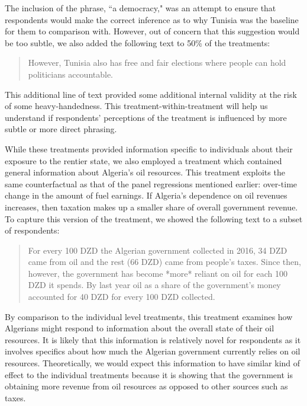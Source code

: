 \documentclass[12pt, letterpaper]{article}
\begin{document}
The inclusion of the phrase, ``a democracy," was an attempt to ensure that respondents would make the correct inference as to why Tunisia was the baseline for them to comparison with. However, out of concern that this suggestion would be too subtle, we also added the following text to 50\% of the treatments:

\begin{quotation}
However, Tunisia also has free and fair elections where people can hold politicians accountable.
\end{quotation}

This additional line of text provided some additional internal validity at the risk of some heavy-handedness. This treatment-within-treatment will help us understand if respondents' perceptions of the treatment is influenced by more subtle or more direct phrasing.

While these treatments provided information specific to individuals about their exposure to the rentier state, we also employed a treatment which contained general information about Algeria's oil resources. This treatment exploits the same counterfactual as that of the panel regressions mentioned earlier: over-time change in the amount of fuel earnings. If Algeria's dependence on oil revenues increases, then taxation makes up a smaller share of overall government revenue. To capture this version of the treatment, we showed the following text to a subset of respondents:

\begin{quotation}
For every 100 DZD the Algerian government collected in 2016, 34 DZD came from oil and the rest (66 DZD) came from people's taxes. Since then, however, the government has become *more* reliant on oil for each 100 DZD it spends.  By last year oil as a share of the government's money accounted for 40 DZD for every 100 DZD collected.
\end{quotation}

By comparison to the individual level treatments, this treatment examines how Algerians might respond to information about the overall state of their oil resources. It is likely that this information is relatively novel for respondents as it involves specifics about how much the Algerian government currently relies on oil resources. Theoretically, we would expect this information to have similar kind of effect to the individual treatments because it is showing that the government is obtaining more revenue from oil resources as opposed to other sources such as taxes. 
\end{document}
